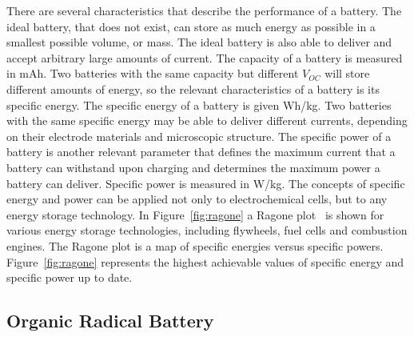 \par
There are several characteristics that describe the performance of a battery. The ideal battery, that does not exist, can store as much energy as possible in a smallest possible volume, or mass. The ideal battery is also able to deliver and accept arbitrary large amounts of current. The capacity of a battery is measured in mAh. Two batteries with the same capacity but different $V_{OC}$ will store different amounts of energy, so the relevant characteristics of a battery is its specific energy. The specific energy of a battery is given Wh/kg. Two batteries with the same specific energy may be able to deliver different currents, depending on their electrode materials and microscopic structure. The specific power of a battery is another relevant parameter that defines the maximum current that a battery can withstand upon charging and determines the maximum power a battery can deliver. Specific power is measured in W/kg. The concepts of specific energy and power can be applied not only to electrochemical cells, but to any energy storage technology. In Figure~\ref{fig:ragone} a Ragone plot~\cite{ragone,Reddy_book} is shown for various energy storage technologies, including flywheels, fuel cells and combustion engines. The Ragone plot is a map of specific energies versus specific powers. Figure~\ref{fig:ragone} represents the highest achievable values of specific energy and specific power up to date.



\subsection{Organic Radical Battery}

